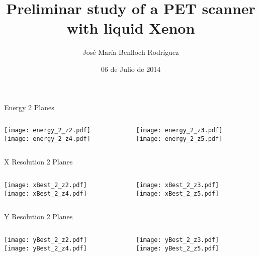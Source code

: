\documentclass{beamer}
\title{Preliminar study of a PET scanner with liquid Xenon}
\author[José María Benlloch Rodríguez]{José María Benlloch Rodríguez}
\institute{NEXT Collaboration}
\date{06 de Julio de 2014}
\begin{document}
\begin{frame}
  \titlepage
\end{frame}

\begin{frame}{Energy 2 Planes}
	\begin{columns}[onlytextwidth]
		\begin{column}{0.5\textwidth}
			\texttt{[image: energy\_2\_z2.pdf]} \\
			\texttt{[image: energy\_2\_z4.pdf]}
		 \end{column}
		 \begin{column}{0.5\textwidth}
			\texttt{[image: energy\_2\_z3.pdf]} \\
			\texttt{[image: energy\_2\_z5.pdf]}
		 \end{column}
 \end{columns}
\end{frame}

\begin{frame}{X Resolution 2 Planes}
	\begin{columns}[onlytextwidth]
		\begin{column}{0.5\textwidth}
			\texttt{[image: xBest\_2\_z2.pdf]} \\
			\texttt{[image: xBest\_2\_z4.pdf]}
		 \end{column}
		 \begin{column}{0.5\textwidth}
			\texttt{[image: xBest\_2\_z3.pdf]} \\
			\texttt{[image: xBest\_2\_z5.pdf]}
		 \end{column}
 \end{columns}
\end{frame}

\begin{frame}{Y Resolution 2 Planes}
	\begin{columns}[onlytextwidth]
		\begin{column}{0.5\textwidth}
			\texttt{[image: yBest\_2\_z2.pdf]} \\
			\texttt{[image: yBest\_2\_z4.pdf]}
		 \end{column}
		 \begin{column}{0.5\textwidth}
			\texttt{[image: yBest\_2\_z3.pdf]} \\
			\texttt{[image: yBest\_2\_z5.pdf]}
		 \end{column}
 \end{columns}
\end{frame}
\end{document}

